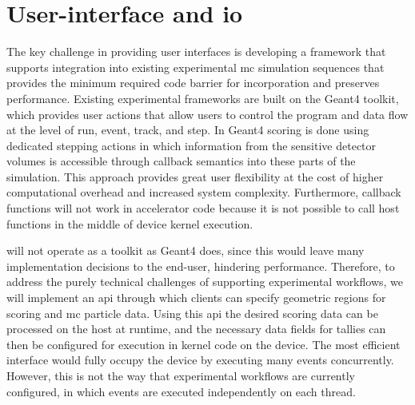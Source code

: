 \section{User-interface and \ac{io}}

The key challenge in providing user interfaces is developing a framework that
supports integration into existing experimental \ac{mc} simulation sequences
that  provides the minimum required code barrier for incorporation and
 preserves performance.  Existing experimental frameworks are built on
the Geant4 toolkit, which provides user actions that allow users to control the
program and data flow at the level of run, event, track, and step. In Geant4
scoring is done using dedicated stepping actions in which information from the
sensitive detector volumes is accessible through callback semantics into these
parts of the simulation.  This approach provides great user flexibility at the
cost of higher computational overhead and increased system complexity.
Furthermore, callback functions will not work in accelerator code because it is
not possible to call host functions in the middle of device kernel execution.

\celeritas will not operate as a toolkit as Geant4 does, since this would leave
many implementation decisions to the end-user, hindering performance. Therefore,
to address the purely technical challenges of supporting experimental workflows,
we will implement an \ac{api} through which clients can specify geometric
regions for scoring and \ac{mc} particle data. Using this \ac{api} the desired
scoring data can be processed on the host at runtime, and the necessary data
fields for tallies can then be configured for execution in kernel code on the
device.  The most efficient interface would fully occupy the device by executing
many events concurrently.  However, this is not the way that experimental
workflows are currently configured, in which events are executed independently
on each thread.

